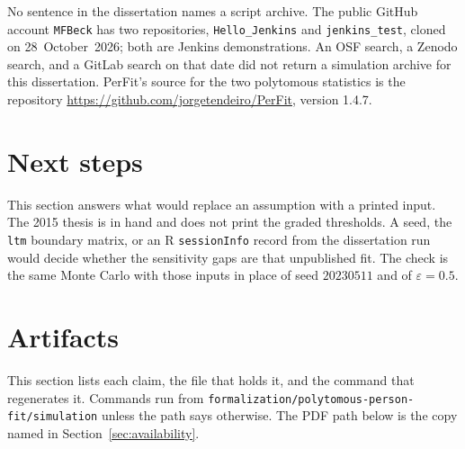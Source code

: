 \documentclass[11pt]{article}
\begin{document}
No sentence in the dissertation names a script archive.
The public GitHub account \texttt{MFBeck} has two repositories,
\texttt{Hello\_Jenkins} and \texttt{jenkins\_test}, cloned on
28~October~2026; both are Jenkins demonstrations.
An OSF search, a Zenodo search, and a GitLab search on that date did
not return a simulation archive for this dissertation.
PerFit's source for the two polytomous statistics is the repository
\url{https://github.com/jorgetendeiro/PerFit}, version 1.4.7.

\section{Next steps}
\label{sec:next}

This section answers what would replace an assumption with a printed
input.
The 2015 thesis is in hand and does not print the graded thresholds.
A seed, the \texttt{ltm} \cite{rizopoulos2006} boundary matrix, or an R \texttt{sessionInfo}
record from the dissertation run would decide whether the sensitivity
gaps are that unpublished fit.
The check is the same Monte Carlo with those inputs in place of seed
\(20230511\) and of \(\varepsilon=0.5\).

\section{Artifacts}
\label{sec:artifacts}

This section lists each claim, the file that holds it, and the command
that regenerates it.
Commands run from \texttt{formalization/polytomous-person-fit/simulation}
unless the path says otherwise.
The PDF path below is the copy named in Section~\ref{sec:availability}.
\end{document}
